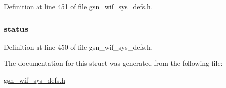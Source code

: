 Definition at line 451 of file gsn\_\-wif\_\-sys\_\-defs.h.

\hypertarget{a00361_ac6b7193d1fe7063cf448ef96398230d8}{
\subsubsection[{status}]{ {\bf status}}}
\label{a00361_ac6b7193d1fe7063cf448ef96398230d8}


Definition at line 450 of file gsn\_\-wif\_\-sys\_\-defs.h.



The documentation for this struct was generated from the following file:\begin{DoxyCompactItemize}
\item 
\hyperlink{a00612}{gsn\_\-wif\_\-sys\_\-defs.h}\end{DoxyCompactItemize}
